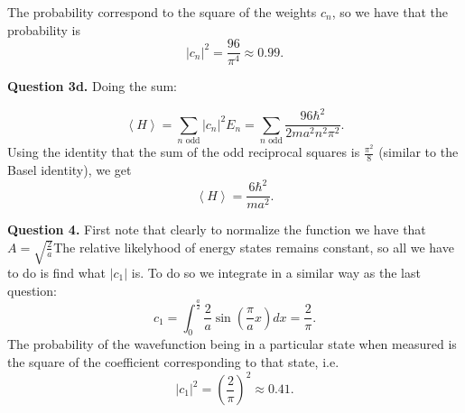 \documentclass[letterpaper, reqno,11pt]{article}
\begin{document}
The probability correspond to the square of the weights $c_n$, so we have that the probability is 
\[
|c_n|^2=\frac{96}{\pi^4}\approx 0.99
.\]

{\noindent\bf Question 3d.} Doing the sum: 

\[
\left<H \right>=\sum_{n\text{ odd}} |c_n|^2 E_n=\sum_{n\text{ odd}}\frac{96 \hbar^2}{2ma^2n^2\pi^2}
.\]
Using the identity that the sum of the odd reciprocal squares is $\frac{\pi^2}{8}$ (similar to the Basel identity), we get 
\[
\left<H \right>=\frac{6\hbar^2}{ma^2}
.\]

{\noindent\bf Question 4.} First note that clearly to normalize the function we have that $A=\sqrt{\frac{2}{a}} $The relative likelyhood of energy states remains constant, so all we have to do is find what $|c_1|$ is. To do so we integrate in a similar way as the last question: 
\[
c_1=\int_0^{\frac{a}{2}}\frac{2}{a}\sin\left( \frac{\pi}{a}x \right) dx=\frac{2}{\pi}
.\]
The probability of the wavefunction being in a particular state when measured is the square of the coefficient corresponding to that state, i.e.
\[
|c_1|^2=\left( \frac{2}{\pi} \right) ^2\approx 0.41
.\]
\end{document}
